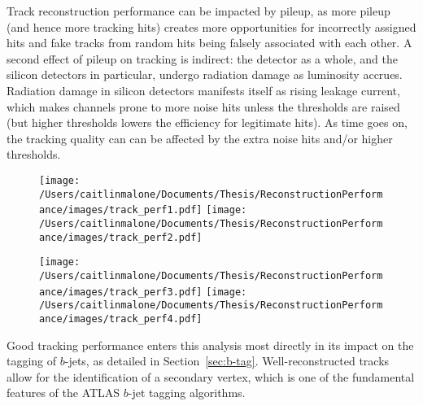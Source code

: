 Track reconstruction performance can be impacted by pileup, as more pileup (and hence more tracking hits) creates more opportunities for incorrectly assigned hits and fake tracks from random hits being falsely associated with each other.  A second effect of pileup on tracking is indirect: the detector as a whole, and the silicon detectors in particular, undergo radiation damage as luminosity accrues.  Radiation damage in silicon detectors manifests itself as rising leakage current, which makes channels prone to more noise hits unless the thresholds are raised (but higher thresholds lowers the efficiency for legitimate hits).  As time goes on, the tracking quality can can be affected by the extra noise hits and/or higher thresholds.

\begin{figure}
	\texttt{[image: /Users/caitlinmalone/Documents/Thesis/ReconstructionPerformance/images/track\_perf1.pdf]}
	\texttt{[image: /Users/caitlinmalone/Documents/Thesis/ReconstructionPerformance/images/track\_perf2.pdf]}
	\label{fig:track_perfA}  
	\caption{}
\end{figure}



\begin{figure}
	\texttt{[image: /Users/caitlinmalone/Documents/Thesis/ReconstructionPerformance/images/track\_perf3.pdf]}
	\texttt{[image: /Users/caitlinmalone/Documents/Thesis/ReconstructionPerformance/images/track\_perf4.pdf]}
	\label{fig:track_perfB}  
	\caption{}
\end{figure}

Good tracking performance enters this analysis most directly in its impact on the tagging of $b$-jets, as detailed in Section~\ref{sec:b-tag}.  Well-reconstructed tracks allow for the identification of a secondary vertex, which is one of the fundamental features of the ATLAS $b$-jet tagging algorithms.






